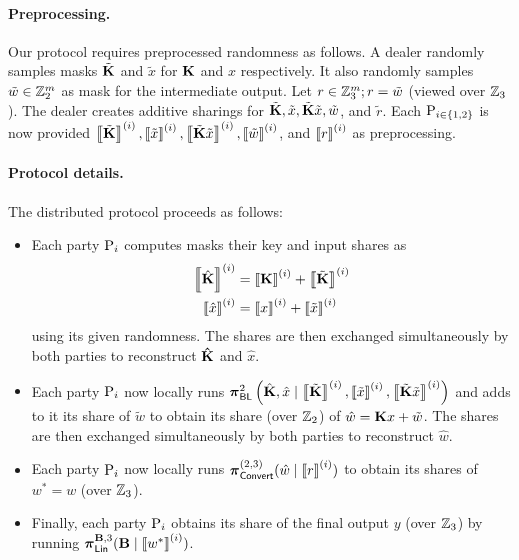 \paragraph{Preprocessing.}
Our protocol requires preprocessed randomness as follows. A dealer randomly samples masks $\tilde{\mat{K}}$ and $\tilde{x}$ for $\mat{K}$ and $x$ respectively. It also randomly samples $\tilde{w} \in \mathbb{Z}_2^m$ as mask for the intermediate output. Let $r \in \mathbb{Z}_3^m; r = \tilde{w}$ (viewed over $\mathbb{Z}_3$). The dealer creates additive sharings for $\tilde{\mat{K}}, \tilde{x}, \tilde{\mat{K}}\tilde{x}, \tilde{w}$, and $\tilde{r}$. Each $\textnormal{P}_{i\in \{1,2\}}$ is now provided $\sharei{\tilde{\mat{K}}}, \sharei{\tilde{x}}, \sharei{\tilde{\mat{K}}\tilde{x}}, \sharei{\tilde{w}}$, and $\left\llbracket r \right\rrbracket^{(i)}$ as preprocessing.

\paragraph{Protocol details.}
The distributed protocol proceeds as follows:
\begin{itemize}
    \item Each party $\textnormal{P}_i$ computes masks their key and input shares as 
    \begin{align*}
    \sharei{\hat{\mat{K}}} &= \sharei{\mat{K}} + \sharei{\tilde{\mat{K}}} \\
    \sharei{\hat{x}} &= \sharei{x} + \sharei{\tilde{x}}
    \end{align*}
    using its given randomness. The shares are then exchanged simultaneously by both parties to reconstruct $\mat{\hat{K}}$ and $\hat{x}$.

    \item Each party $\textnormal{P}_i$ now locally runs $\prot_\BLMap^2 \left(\hat{\mat{K}}, \hat{x} \mid \sharei{\tilde{\mat{K}}}, \sharei{\tilde{x}}, \sharei{\tilde{\mat{K}}\tilde{x}}\right)$ and adds to it its share of $\tilde{w}$ to obtain its share (over $\mathbb{Z}_2$) of $\hat{w} = \mat{K}x + \tilde{w}$. The shares are then exchanged simultaneously by both parties to reconstruct $\hat{w}$.

    \item Each party $\textnormal{P}_i$ now locally runs $\boldsymbol{\pi}_{\textsf{Convert}}^{(2,3)}(\hat{w} \mid \left\llbracket r \right\rrbracket^{(i)})$ to obtain its shares of $w^* = w$ (over $\mathbb{Z}_3$).

    \item Finally, each party $\textnormal{P}_i$ obtains its share of the final output $y$ (over $\mathbb{Z}_3$) by running $\prot_\LMap^{\mat{B}, 3}(\mat{B} \mid \sharei{w^*})$.
\end{itemize}



